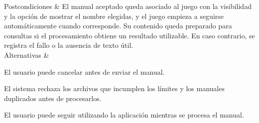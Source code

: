 \begin{longtblr}[
    caption={\textbf{CU-16}. Añadir un manual.},
    label={tab:cu:CU-16}
]
        Postcondiciones & El manual aceptado queda asociado al juego con la visibilidad y la opción de mostrar el nombre elegidas, y el juego empieza a seguirse automáticamente cuando corresponde. Su contenido queda preparado para consultas si el procesamiento obtiene un resultado utilizable. En caso contrario, se registra el fallo o la ausencia de texto útil. \\
        Alternativas & \begin{alternativasCU}
            \item El usuario puede cancelar antes de enviar el manual.
            \item El sistema rechaza los archivos que incumplen los límites y los manuales duplicados antes de procesarlos.
            \item El usuario puede seguir utilizando la aplicación mientras se procesa el manual.
        \end{alternativasCU} \\
\end{longtblr}


\clearpage

